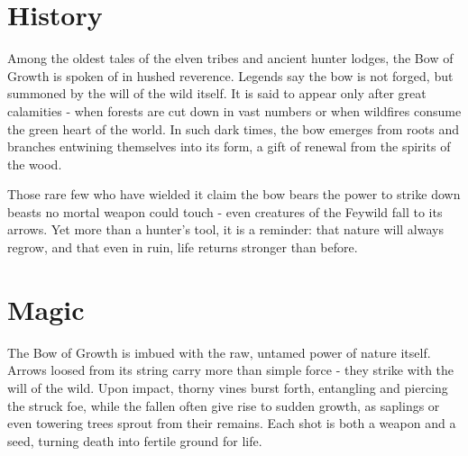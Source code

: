 \section*{History}
{\entryfont Among the oldest tales of the elven tribes and ancient hunter lodges, the Bow of Growth is spoken of in hushed reverence. Legends say the bow is not forged, but summoned by the will of the wild itself. It is said to appear only after great calamities - when forests are cut down in vast numbers or when wildfires consume the green heart of the world. In such dark times, the bow emerges from roots and branches entwining themselves into its form, a gift of renewal from the spirits of the wood.

Those rare few who have wielded it claim the bow bears the power to strike down beasts no mortal weapon could touch - even creatures of the Feywild fall to its arrows. Yet more than a hunter's tool, it is a reminder: that nature will always regrow, and that even in ruin, life returns stronger than before.}
\vfill\eject
\section*{Magic}
{\entryfont The Bow of Growth is imbued with the raw, untamed power of nature itself. Arrows loosed from its string carry more than simple force - they strike with the will of the wild. Upon impact, thorny vines burst forth, entangling and piercing the struck foe, while the fallen often give rise to sudden growth, as saplings or even towering trees sprout from their remains. Each shot is both a weapon and a seed, turning death into fertile ground for life.}
